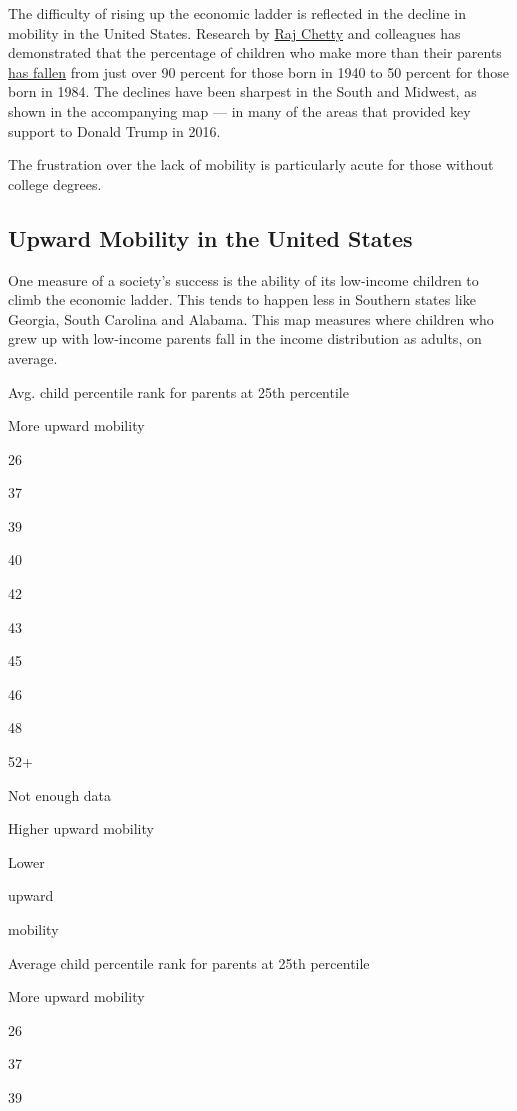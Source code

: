 The difficulty of rising up the economic ladder is reflected in the
decline in mobility in the United States. Research by
\href{http://www.rajchetty.com/}{Raj Chetty} and colleagues has
demonstrated that the percentage of children who make more than their
parents \href{https://www.nber.org/papers/w22910}{has fallen} from just
over 90 percent for those born in 1940 to 50 percent for those born in
1984. The declines have been sharpest in the South and Midwest, as shown
in the accompanying map --- in many of the areas that provided key
support to Donald Trump in 2016.

The frustration over the lack of mobility is particularly acute for
those without college degrees.

\hypertarget{upward-mobility-in-the-united-states}{%
\subsection{Upward Mobility in the United
States}\label{upward-mobility-in-the-united-states}}

One measure of a society's success is the ability of its low-income
children to climb the economic ladder. This tends to happen less in
Southern states like Georgia, South Carolina and Alabama. This map
measures where children who grew up with low-income parents fall in the
income distribution as adults, on average.

Avg. child percentile rank for parents at 25th percentile

More upward mobility

26

37

39

40

42

43

45

46

48

52+

Not enough data

Higher upward mobility

Lower

upward

mobility

Average child percentile rank for parents at 25th percentile

More upward mobility

26

37

39

